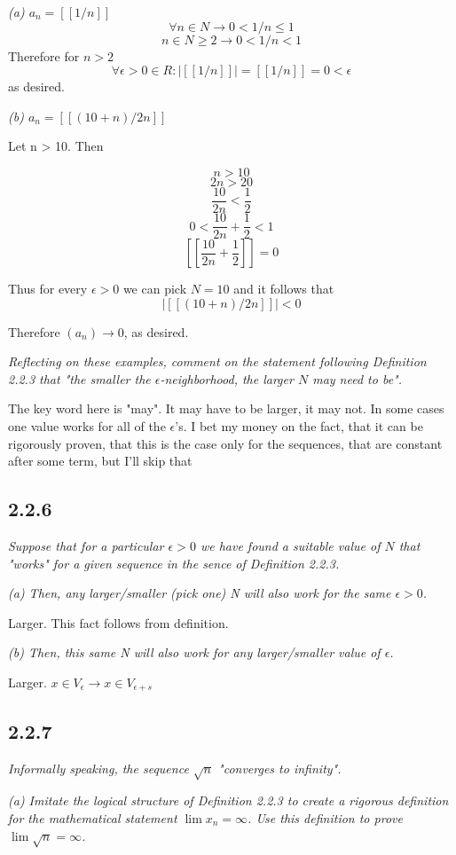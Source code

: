 \documentclass[11pt,oneside,titlepage]{book}
\begin{document}
\textit{(a) $a_n = [[1/n]]$}
$$\forall n \in N \to 0  < 1/n \leq 1$$
$$n \in N \geq 2 \to  0  < 1/n < 1$$
Therefore for $n > 2$
$$\forall \epsilon > 0 \in R: |[[1/n]]| = [[1/n]] = 0 < \epsilon$$
as desired.

\textit{(b) $a_n = [[(10 + n)/2n]]$}

Let n > 10. Then

$$n > 10$$
$$2n > 20$$
$$\frac{10}{2n} < \frac{1}{2}$$
$$0 < \frac{10}{2n} + \frac{1}{2} < 1$$
$$[[\frac{10}{2n} + \frac{1}{2} ]] = 0$$

Thus for every $\epsilon > 0$ we can pick $N = 10$ and it follows that 
$$|[[(10 + n)/2n]]| < 0$$

Therefore $(a_n) \to 0$, as desired.

\textit{Reflecting on these examples, comment on the statement following Definition
  2.2.3 that "the smaller the $\epsilon$-neighborhood, the larger $N$ may
  need to be".}

The key word here is "may". It may have to be larger, it may not. In some cases one
value works for all of the $\epsilon$'s. I bet my money on the fact, that it
can be rigorously proven, that this is the case only for the sequences, that are constant after
some term, but I'll skip that

\subsection*{2.2.6}
\textit{Suppose that for a particular $\epsilon > 0$ we have found a suitable
  value of $N$ that "works" for a given sequence in the sence of Definition 2.2.3.}

\textit{(a) Then, any larger/smaller (pick one) N will also work for the same $\epsilon > 0$.}

Larger. This fact follows from definition.

\textit{(b) Then, this same N will also work for any larger/smaller value of $\epsilon$.}

Larger. $x \in V_\epsilon \to x \in V_{\epsilon + s}$

\subsection*{2.2.7}
\textit{Informally speaking, the sequence $\sqrt{n}$ "converges to infinity".}

\textit{(a) Imitate the logical structure of Definition 2.2.3 to create a rigorous definition
  for the mathematical statement $\lim x_n = \infty$. Use this definition to prove
  $\lim \sqrt{n} = \infty$.}
\end{document}
